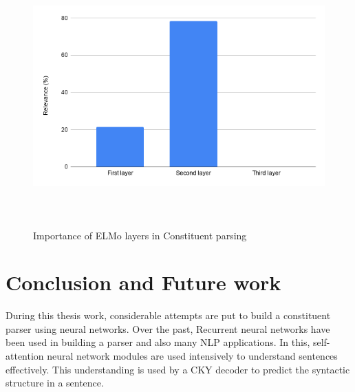 \documentclass[a4paper, 11pt]{article}
\begin{document}
\begin{figure}[H]
    \centering
    \includegraphics[width=\textwidth,height=10cm,keepaspectratio=true]
    {elmo-layers-relevance.png}
    \caption{
        Importance of ELMo layers in Constituent parsing
    }
    \label{fig:elmo-layers-relevance}
\end{figure}






\pagebreak
\section{Conclusion and Future work}
During this thesis work, considerable attempts are put to build a constituent parser using neural networks. Over the past, Recurrent neural networks have been used in building a parser and also many NLP applications. In this, self-attention neural network modules are used intensively to understand sentences effectively. This understanding is used by a CKY decoder to predict the syntactic structure in a sentence. 
\end{document}
